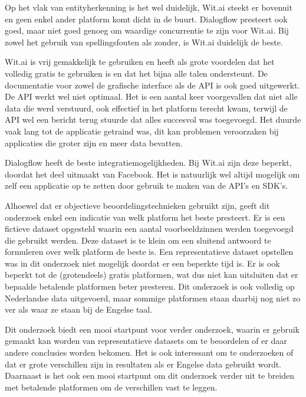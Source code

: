 Op het vlak van entityherkenning is het wel duidelijk, Wit.ai steekt er bovenuit en geen enkel ander platform komt dicht in de buurt. Dialogflow presteert ook goed, maar niet goed genoeg om waardige concurrentie te zijn voor Wit.ai. Bij zowel het gebruik van spellingsfouten als zonder, is Wit.ai duidelijk de beste.

Wit.ai is vrij gemakkelijk te gebruiken en heeft als grote voordelen dat het volledig gratis te gebruiken is en dat het bijna alle talen ondersteunt. De documentatie voor zowel de grafische interface als de API is ook goed uitgewerkt. De API werkt wel niet optimaal. Het is een aantal keer voorgevallen dat niet alle data die werd verstuurd, ook effectief in het platform terecht kwam, terwijl de API wel een bericht terug stuurde dat alles succesvol was toegevoegd. Het duurde vaak lang tot de applicatie getraind was, dit kan problemen veroorzaken bij applicaties die groter zijn en meer data bevatten.

Dialogflow heeft de beste integratiemogelijkheden. Bij Wit.ai zijn deze beperkt, doordat het deel uitmaakt van Facebook. Het is natuurlijk wel altijd mogelijk om zelf een applicatie op te zetten door gebruik te maken van de API’s en SDK’s.

Alhoewel dat er objectieve beoordelingstechnieken gebruikt zijn, geeft dit onderzoek enkel een indicatie van welk platform het beste presteert. Er is een fictieve dataset opgesteld waarin een aantal voorbeeldzinnen werden toegevoegd die gebruikt werden. Deze dataset is te klein om een sluitend antwoord te formuleren over welk platform de beste is. Een representatieve dataset opstellen was in dit onderzoek niet mogelijk doordat er een beperkte tijd is. Er is ook beperkt tot de (grotendeels) gratis platformen, wat dus niet kan uitsluiten dat er bepaalde betalende platformen beter presteren. Dit onderzoek is ook volledig op Nederlandse data uitgevoerd, maar sommige platformen staan daarbij nog niet zo ver als waar ze staan bij de Engelse taal.

Dit onderzoek biedt een mooi startpunt voor verder onderzoek, waarin er gebruik gemaakt kan worden van representatieve datasets om te beoordelen of er daar andere conclusies worden bekomen. Het is ook interessant om te onderzoeken of dat er grote verschillen zijn in resultaten als er Engelse data gebruikt wordt. Daarnaast is het ook een mooi startpunt om dit onderzoek verder uit te breiden met betalende platformen om de verschillen vast te leggen.


